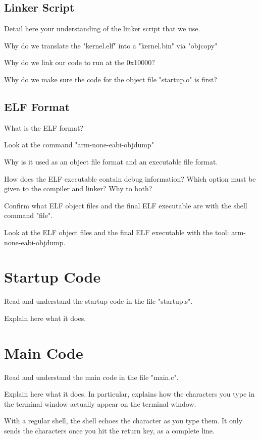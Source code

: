 \documentclass[10]{article}
\begin{document}
\subsection{Linker Script}

Detail here your understanding of the linker script that we use.

Why do we translate the "kernel.elf" into a "kernel.bin" via "objcopy"

Why do we link our code to run at the 0x10000? 

Why do we make sure the code for the object file "startup.o" is first?

\subsection{ELF Format}

What is the ELF format?

Look at the command "arm-none-eabi-objdump"

Why is it used as an object file format and an executable file format.

How does the ELF executable contain debug information? Which option must
be given to the compiler and linker? Why to both?

Confirm what ELF object files and the final ELF executable are with the shell command "file".

Look at the ELF object files and the final ELF executable with the tool: arm-none-eabi-objdump.

\section{Startup Code}

Read and understand the startup code in the file "startup.s".

Explain here what it does.

\section{Main Code}

Read and understand the main code in the file "main.c".

Explain here what it does. In particular, explains how the characters
you type in the terminal window actually appear on the terminal window.

With a regular shell, the shell echoes the character as you type them.
It only sends the characters once you hit the return key, as a complete line.
\end{document}
